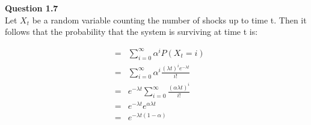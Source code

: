\documentclass[10pt,a4paper]{article}
\begin{document}
\begin{flushleft}
\begin{eqnarray*}
\\
\end{eqnarray*}

\textbf{Question 1.7}\\
Let $X_t$ be a random variable counting the number of shocks up to
time t.  Then it follows that the probability that the system is
surviving at time t is:

\begin{eqnarray*}
&=&\sum_{i=0}^{\infty} \alpha^i P(X_t=i)\\
&=&\sum_{i=0}^{\infty} \alpha^i \frac{(\lambda t)^i e^{-\lambda t}
}{i!}\\
&=& e^{-\lambda t} \sum_{i=0}^{\infty} \frac{(\alpha\lambda t)^i}
{i!}\\
&=&e^{-\lambda t} e^{\alpha\lambda t} \\
&=&e^{-\lambda t (1- \alpha)} \\
\end{eqnarray*}

\begin{eqnarray*}
\\
\end{eqnarray*}

\end{flushleft}
\end{document}
